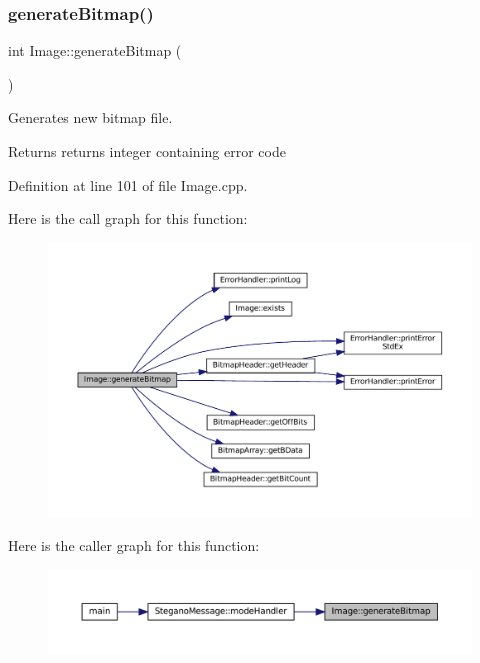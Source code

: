 \subsubsection{\texorpdfstring{generateBitmap()}{generateBitmap()}}
{\footnotesize\ttfamily int Image\+::generate\+Bitmap (\begin{DoxyParamCaption}{ }\end{DoxyParamCaption})}



Generates new bitmap file. 

\begin{DoxyReturn}{Returns}
returns integer containing error code 
\end{DoxyReturn}


Definition at line 101 of file Image.\+cpp.

Here is the call graph for this function\+:
\nopagebreak
\begin{figure}[H]
\begin{center}
\leavevmode
\includegraphics[width=350pt]{classImage_a3ca1ae6c1eb2846bfba066b01e6020e1_cgraph}
\end{center}
\end{figure}
Here is the caller graph for this function\+:
\nopagebreak
\begin{figure}[H]
\begin{center}
\leavevmode
\includegraphics[width=350pt]{classImage_a3ca1ae6c1eb2846bfba066b01e6020e1_icgraph}
\end{center}
\end{figure}
\mbox{\label{classImage_a75b5051c6cc39a5e3f86d287f5cc7f9c}} 
